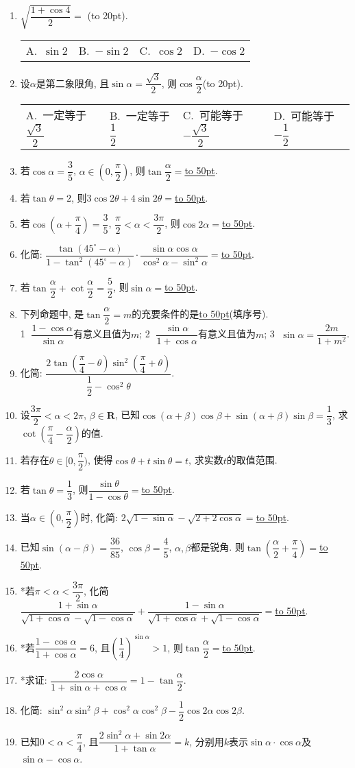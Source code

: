 \documentclass[10pt,a4paper]{article}
\newcommand{\blank}[1]{\underline{\hbox to #1pt{}}}
\newcommand{\bracket}[1]{(\hbox to #1pt{})}
\newcommand{\fourch}[4]{\par\begin{tabular}{p{.23\textwidth}p{.23\textwidth}p{.23\textwidth}p{.23\textwidth}}
A.~#1 &B.~#2& C.~#3& D.~#4
\end{tabular}}
\begin{document}
\begin{enumerate}[1.]

\item $\sqrt{\dfrac{1+\cos 4}2}=$ \bracket{20}.
\fourch{$\sin 2$}{$-\sin 2$}{$\cos 2$}{$-\cos 2$}
\item 设$\alpha$是第二象限角, 且$\sin\alpha=\dfrac{\sqrt 3}2$, 则$\cos\dfrac{\alpha}2$\bracket{20}.
\fourch{一定等于$\dfrac{\sqrt 3}2$}{一定等于$\dfrac 12$}{可能等于$-\dfrac{\sqrt 3}2$}{可能等于$-\dfrac 12$}
\item 若$\cos\alpha=\dfrac 35$, $\alpha\in (0,\dfrac{\pi}2)$, 则$\tan\dfrac{\alpha}2=$\blank{50}.
\item 若$\tan\theta=2$, 则$3\cos 2\theta+4\sin 2\theta=$\blank{50}.
\item 若$\cos(\alpha+\dfrac{\pi}4)=\dfrac 35$, $\dfrac{\pi}2<\alpha<\dfrac{3\pi}2$, 则$\cos 2\alpha=$\blank{50}.
\item 化简: $\dfrac{\tan (45^\circ-\alpha)}{1-\tan^2(45^\circ-\alpha)}\cdot \dfrac{\sin \alpha \cos \alpha}{\cos^2\alpha -\sin ^2\alpha}=$\blank{50}.
\item 若$\tan\dfrac{\alpha}2+\cot\dfrac{\alpha}2=\dfrac 52$, 则$\sin\alpha=$\blank{50}.
\item 下列命题中, 是$\tan\dfrac{\alpha}2=m$的充要条件的是\blank{50}(填序号).\\
\textcircled{1} $\dfrac{1-\cos \alpha}{\sin \alpha}$有意义且值为$m$; 	\textcircled{2} $\dfrac{\sin \alpha}{1+\cos \alpha}$有意义且值为$m$; \textcircled{3} $\sin \alpha =\dfrac{2m}{1+{m^2}}$.
\item 化简: $\dfrac{2\tan (\dfrac{\pi}4-\theta)\sin^2(\dfrac{\pi}4+\theta)}{\dfrac 12-\cos^2\theta}$.
\item 设$\dfrac{3\pi}2<\alpha<2\pi$, $\beta\in \mathbf{R}$, 已知$\cos(\alpha+\beta)\cos\beta+\sin(\alpha+\beta)\sin\beta=\dfrac 13$, 求$\cot(\dfrac{\pi}4-\dfrac{\alpha}2)$的值.
\item 若存在$\theta\in [0,\dfrac{\pi}2)$, 使得$\cos\theta+t\sin\theta=t$, 求实数$t$的取值范围.
\item 若$\tan \theta=\dfrac 13$, 则$\dfrac{\sin\theta}{1-\cos\theta}=$\blank{50}.
\item 当$\alpha\in (0,\dfrac{\pi}2)$时, 化简: $2\sqrt{1-\sin \alpha}-\sqrt{2+2\cos\alpha}=$\blank{50}.
\item 已知$\sin(\alpha-\beta)=\dfrac{36}{85}$, $\cos\beta=\dfrac 45$, $\alpha,\beta$都是锐角. 则$\tan(\dfrac{\alpha}2+\dfrac{\pi}4)=$\blank{50}.
\item *若$\pi<\alpha<\dfrac{3\pi}2$, 化简$\dfrac{1+\sin\alpha}{\sqrt{1+\cos\alpha}-\sqrt{1-\cos\alpha}}+\dfrac{1-\sin\alpha}{\sqrt{1+\cos\alpha}+\sqrt{1-\cos\alpha}}=$\blank{50}.
\item *若$\dfrac{1-\cos\alpha}{1+\cos\alpha}=6$, 且$(\dfrac 14)^{\sin\alpha}>1$, 则$\tan\dfrac{\alpha}2=$\blank{50}.
\item *求证: $\dfrac{2\cos\alpha}{1+\sin\alpha+\cos\alpha}=1-\tan\dfrac{\alpha}2$.
\item 化简: $\sin^2\alpha\sin^2\beta+\cos^2\alpha\cos^2\beta-\dfrac 12\cos2\alpha\cos 2\beta$.
\item 已知$0<\alpha<\dfrac{\pi}4$, 且$\dfrac{2\sin^2\alpha+\sin 2\alpha}{1+\tan \alpha}=k$, 分别用$k$表示$\sin\alpha\cdot \cos\alpha$及$\sin\alpha-\cos\alpha$.


\end{enumerate}
\end{document}
